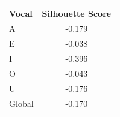 \begin{tabular}{lc}
\toprule
\rowcolor{col01}
Vocal & Silhouette Score \\
\midrule
A & -0.179 \\
E & -0.038 \\
I & -0.396 \\
O & -0.043 \\
U & -0.176 \\
Global & -0.170 \\
\bottomrule
\end{tabular}
